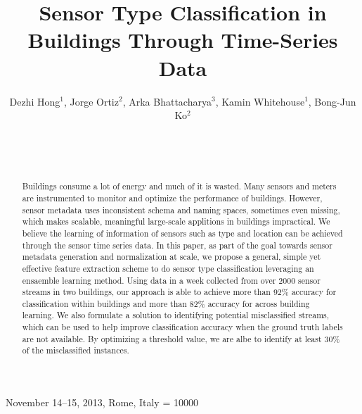 \documentclass{sig-alternate}
\begin{document}
 {November 14--15, 2013, Rome, Italy} 
\widowpenalty = 10000

\title{Sensor Type Classification in Buildings Through Time-Series Data
}
\author{
\alignauthor
Dezhi Hong$^1$, Jorge Ortiz$^2$, Arka Bhattacharya$^3$, Kamin Whitehouse$^1$, Bong-Jun Ko$^2$\\
	\\
	\\
	\\
}

\maketitle
\begin{abstract}
Buildings consume a lot of energy and much of it is wasted. Many sensors and meters are instrumented to monitor and optimize the performance of buildings. 
However, sensor metadata uses inconsistent schema and naming spaces, sometimes even missing, which makes scalable, meaningful large-scale applitions in 
buildings impractical. We believe the learning of information of sensors such as type and location can be achieved through the sensor time series data. 
In this paper, as part of the goal towards sensor metadata generation and normalization at scale, we propose a general, simple yet effective feature extraction 
scheme to do sensor type classification leveraging an ensaemble learning method. Using data in a week collected from over 2000 sensor streams in two buildings, 
our approach is able to achieve more than 92\% accuracy for classification within buildings and more than 82\% accuracy for across building learning. We also 
formulate a solution to identifying potential misclassified streams, which can be used to help improve classification accuracy when the ground truth labels 
are not available. By optimizing a threshold value, we are albe to identify at least 30\% of the misclassified instances.
\end{abstract}

\end{document}
